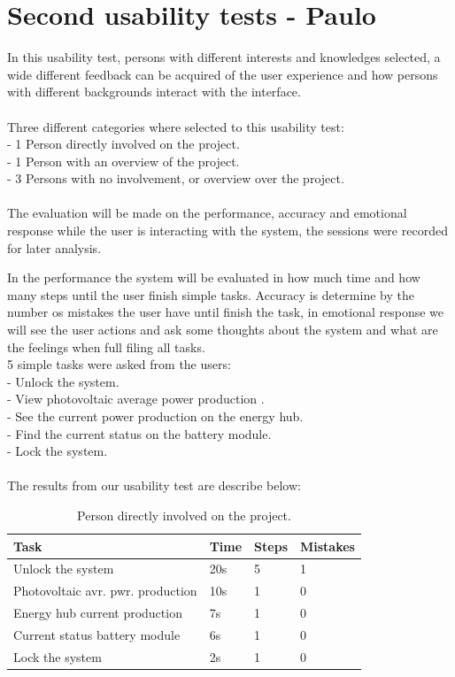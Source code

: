\section{Second usability tests - Paulo}

In this usability test, persons with different interests and knowledges selected, a wide different feedback can be acquired of the user experience and how persons with different backgrounds interact with the interface.
\\
\\Three different categories where selected to this usability test:\\
- 1 Person directly involved on the project.\\
- 1 Person with an overview of the project.\\
- 3 Persons with no involvement, or overview over the project.\\
\\

The evaluation will be made on the performance, accuracy and emotional response while the user is interacting with the system, the sessions were recorded for later analysis.

In the performance the system will be evaluated in how much time and how many steps until the user finish simple tasks. Accuracy is determine by the number os mistakes the user have until finish the task, in emotional response we will see the user actions and ask some thoughts about the system and what are the feelings when full filing all tasks.
\\
5 simple tasks were asked from the users:\\
- Unlock the system.\\
- View photovoltaic average power production .\\
- See the current power production on the energy hub.\\
- Find the current status on the battery module.\\
- Lock the system.\\
\\
The results from our usability test are describe below:

\begin{table}[H]
\begin{tabular}{ | l | l | l | l |}
	\hline
	Task & Time & Steps & Mistakes \\ \hline
	Unlock the system & 20s  & 5 & 1 \\ \hline
	Photovoltaic avr. pwr. production & 10s & 1 & 0 \\ \hline
	Energy hub current production & 7s & 1 & 0 \\ \hline
	Current status battery module & 6s & 1 & 0 \\ \hline
	Lock the system & 2s & 1 & 0 \\ \hline
\end{tabular}
\caption{Person directly involved on the project.}
\end{table}

